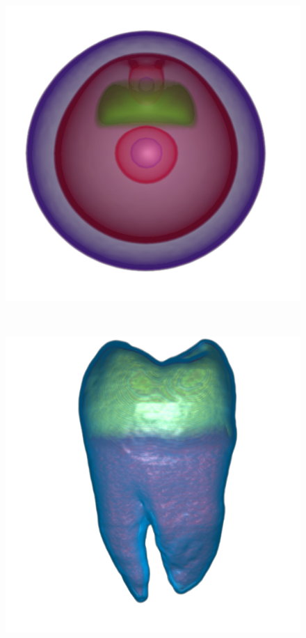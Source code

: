 \begin{figure}
\begin{minipage}{.15\textwidth}
\end{minipage}~
\begin{minipage}{.15\textwidth}
	\includegraphics[width=1\linewidth]{images/nucleon_naive}
\end{minipage}~
\begin{minipage}{.15\textwidth}
	\includegraphics[width=1\linewidth]{images/tooth_naive}

\end{minipage}
\end{figure}
